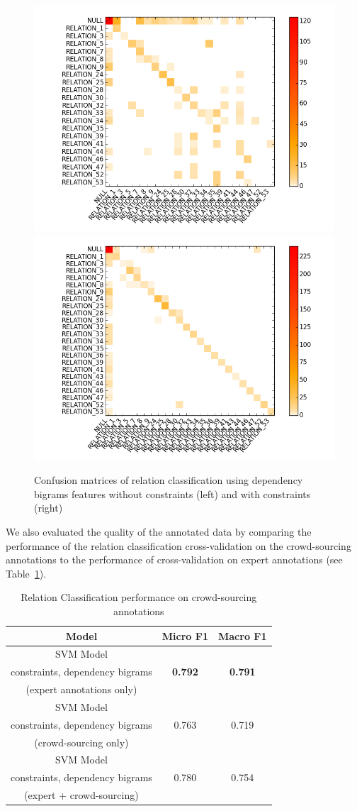 \documentclass[twocolumn]{article}
\begin{document}
\begin{figure}[t]
   \centering
   \includegraphics[width=0.5\linewidth]{Figures/Confusion_Matrices/confusionMatrixRelationClassification_noConstraints.png}\hfill
   \includegraphics[width=0.5\linewidth]{Figures/Confusion_Matrices/confusionMatrixRelationClassification_constraints.png}
   \caption{\label{relationConfusion} Confusion matrices of relation classification using dependency bigrams features without constraints (left) and with constraints (right)}
\end{figure}

We also evaluated the quality of the annotated data by comparing the performance of the relation classification cross-validation on the crowd-sourcing annotations to the performance of cross-validation on expert annotations (see Table~\ref{crowdSourcingRelationClassification}).

\begin{table}[t]
\center
\begin{tabular}{c||c|c}
	Model & Micro F1 & Macro F1 \\
	\hline
	\hline
	SVM Model & & \\
	constraints, dependency bigrams & \textbf{0.792} & \textbf{0.791} \\
	(expert annotations only) & & \\ \hline
	SVM Model & & \\
	constraints, dependency bigrams & 0.763 & 0.719 \\
	(crowd-sourcing only) & & \\ \hline
	SVM Model & & \\
	constraints, dependency bigrams & 0.780 & 0.754 \\
	(expert + crowd-sourcing) & &
\end{tabular}
\caption{\label{crowdSourcingRelationClassification} Relation Classification performance on crowd-sourcing annotations}
\end{table}
\end{document}
